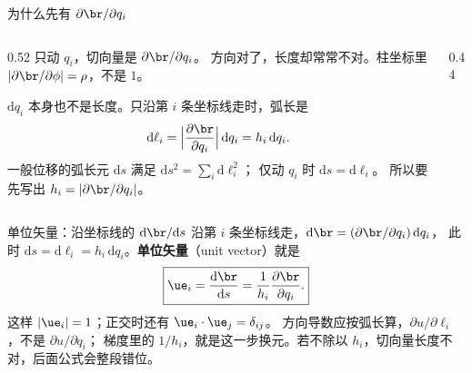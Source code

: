 \documentclass[fontset=windows, chinese, 10pt, xcolor=dvipsnames]{beamer}
\begin{document}
\begin{frame}{为什么先有 $\partial\br/\partial q_i$}
  \begin{columns}[c]
    \begin{column}{0.52\textwidth}
      只动 $q_i$，切向量是 $\partial\br/\partial q_i$。
      方向对了，长度却常常不对。柱坐标里 $|\partial\br/\partial\phi|=\rho$，不是 $1$。
      \vspace{0.3em}

      $\mathrm{d}q_i$ 本身也不是长度。只沿第 $i$ 条坐标线走时，弧长是
      \begin{equation*}
        \mathrm{d}\ell_i
        =\Bigl|\frac{\partial\br}{\partial q_i}\Bigr|\,\mathrm{d}q_i
        =h_i\,\mathrm{d}q_i.
      \end{equation*}
      一般位移的弧长元 $\mathrm{d}s$ 满足
      $\mathrm{d}s^2=\sum_i\mathrm{d}\ell_i^2$；
      仅动 $q_i$ 时 $\mathrm{d}s=\mathrm{d}\ell_i$。
      所以要先写出 $h_i=|\partial\br/\partial q_i|$。
    \end{column}
    \begin{column}{0.44\textwidth}
      \centering
      \scalebox{0.88}{}
    \end{column}
  \end{columns}
\end{frame}

\begin{frame}{单位矢量：沿坐标线的 $\mathrm{d}\br/\mathrm{d}s$}
  沿第 $i$ 条坐标线走，$\mathrm{d}\br=(\partial\br/\partial q_i)\,\mathrm{d}q_i$，
  此时 $\mathrm{d}s=\mathrm{d}\ell_i=h_i\,\mathrm{d}q_i$。\textbf{单位矢量}（unit vector）就是
  \begin{equation*}
    \boxed{\displaystyle
      \ue_i
      =\frac{\mathrm{d}\br}{\mathrm{d}s}
      =\frac{1}{h_i}\frac{\partial\br}{\partial q_i}.}
  \end{equation*}
  这样 $|\ue_i|=1$；正交时还有 $\ue_i\cdot\ue_j=\delta_{ij}$。
  方向导数应按弧长算，$\partial u/\partial\ell_i$，不是 $\partial u/\partial q_i$；
  梯度里的 $1/h_i$，就是这一步换元。若不除以 $h_i$，切向量长度不对，后面公式会整段错位。
\end{frame}

\end{document}
